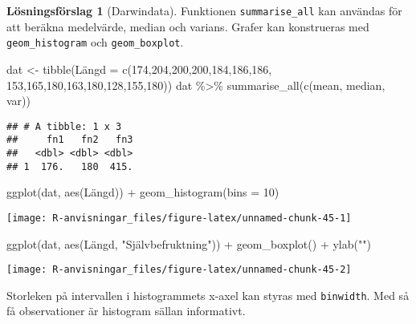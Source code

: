 \documentclass[
]{book}
\newenvironment{Shaded}{\begin{snugshade}}{\end{snugshade}}
\newcommand{\AttributeTok}[1]{\textcolor[rgb]{0.77,0.63,0.00}{#1}}
\newcommand{\DecValTok}[1]{\textcolor[rgb]{0.00,0.00,0.81}{#1}}
\newcommand{\FunctionTok}[1]{\textcolor[rgb]{0.00,0.00,0.00}{#1}}
\newcommand{\NormalTok}[1]{#1}
\newcommand{\OtherTok}[1]{\textcolor[rgb]{0.56,0.35,0.01}{#1}}
\newcommand{\SpecialCharTok}[1]{\textcolor[rgb]{0.00,0.00,0.00}{#1}}
\newcommand{\StringTok}[1]{\textcolor[rgb]{0.31,0.60,0.02}{#1}}
\theoremstyle{definition}
\theoremstyle{definition}
\theoremstyle{definition}
\theoremstyle{definition}
\newtheorem{hypothesis}{Lösningsförslag}[chapter]
\theoremstyle{remark}
\begin{document}
\begin{hypothesis}[Darwindata]
Funktionen \texttt{summarise\_all} kan användas för att beräkna medelvärde, median och varians. Grafer kan konstrueras med \texttt{geom\_histogram} och \texttt{geom\_boxplot}.

\begin{Shaded}
\begin{Highlighting}[]
\NormalTok{dat }\OtherTok{\textless{}{-}} \FunctionTok{tibble}\NormalTok{(Längd }\OtherTok{=} \FunctionTok{c}\NormalTok{(}\DecValTok{174}\NormalTok{,}\DecValTok{204}\NormalTok{,}\DecValTok{200}\NormalTok{,}\DecValTok{200}\NormalTok{,}\DecValTok{184}\NormalTok{,}\DecValTok{186}\NormalTok{,}\DecValTok{186}\NormalTok{,}
                        \DecValTok{153}\NormalTok{,}\DecValTok{165}\NormalTok{,}\DecValTok{180}\NormalTok{,}\DecValTok{163}\NormalTok{,}\DecValTok{180}\NormalTok{,}\DecValTok{128}\NormalTok{,}\DecValTok{155}\NormalTok{,}\DecValTok{180}\NormalTok{))}
\NormalTok{dat }\SpecialCharTok{\%\textgreater{}\%} 
  \FunctionTok{summarise\_all}\NormalTok{(}\FunctionTok{c}\NormalTok{(mean, median, var))}
\end{Highlighting}
\end{Shaded}

\begin{verbatim}
## # A tibble: 1 x 3
##     fn1   fn2   fn3
##   <dbl> <dbl> <dbl>
## 1  176.   180  415.
\end{verbatim}

\begin{Shaded}
\begin{Highlighting}[]
\FunctionTok{ggplot}\NormalTok{(dat, }\FunctionTok{aes}\NormalTok{(Längd)) }\SpecialCharTok{+} 
  \FunctionTok{geom\_histogram}\NormalTok{(}\AttributeTok{bins =} \DecValTok{10}\NormalTok{)}
\end{Highlighting}
\end{Shaded}

\begin{center}\texttt{[image: R-anvisningar\_files/figure-latex/unnamed-chunk-45-1]} \end{center}

\begin{Shaded}
\begin{Highlighting}[]
\FunctionTok{ggplot}\NormalTok{(dat, }\FunctionTok{aes}\NormalTok{(Längd, }\StringTok{"Självbefruktning"}\NormalTok{)) }\SpecialCharTok{+} 
  \FunctionTok{geom\_boxplot}\NormalTok{() }\SpecialCharTok{+}
  \FunctionTok{ylab}\NormalTok{(}\StringTok{""}\NormalTok{)}
\end{Highlighting}
\end{Shaded}

\begin{center}\texttt{[image: R-anvisningar\_files/figure-latex/unnamed-chunk-45-2]} \end{center}

Storleken på intervallen i histogrammets x-axel kan styras med \texttt{binwidth}. Med så få observationer är histogram sällan informativt.
\end{hypothesis}
\end{document}
